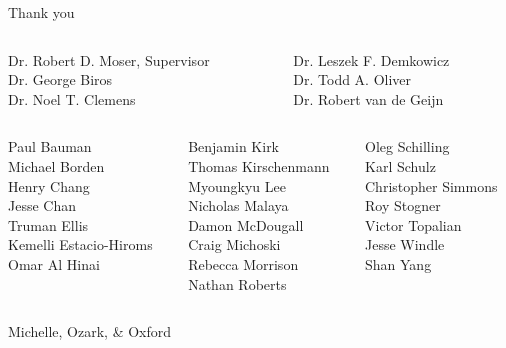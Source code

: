 \documentclass[mathserif]{beamer}
\begin{document}
\begin{frame}{Thank you}
\begin{center}
\begin{columns}
   \begin{column}{0.44\linewidth}
      Dr\@. Robert D. Moser, Supervisor \\
      Dr\@. George Biros \\
      Dr\@. Noel T. Clemens
  \end{column}
  \begin{column}{0.44\linewidth}
      Dr\@. Leszek F. Demkowicz \\
      Dr\@. Todd A. Oliver \\
      Dr\@. Robert van de Geijn
  \end{column}
\end{columns}
\vspace{2em}
\pause{}
\begin{columns}[t]
    \begin{column}{0.32\linewidth}
        Paul Bauman \\
        Michael Borden \\
        Henry Chang \\
        Jesse Chan \\
        Truman Ellis \\
        Kemelli Estacio-Hiroms \\
        Omar Al Hinai
    \end{column}
    \begin{column}{0.32\linewidth}
        Benjamin Kirk \\
        Thomas Kirschenmann \\
        Myoungkyu Lee \\
        Nicholas Malaya \\
        Damon McDougall \\
        Craig Michoski \\
        Rebecca Morrison \\
        Nathan Roberts
    \end{column}
    \begin{column}{0.32\linewidth}
        Oleg Schilling \\
        Karl Schulz \\
        Christopher Simmons \\
        Roy Stogner \\
        Victor Topalian \\
        Jesse Windle \\
        Shan Yang
    \end{column}
\end{columns}
\vspace{2em}
\pause{}
Michelle, Ozark, \& Oxford
\end{center}
\end{frame}


\end{document}
